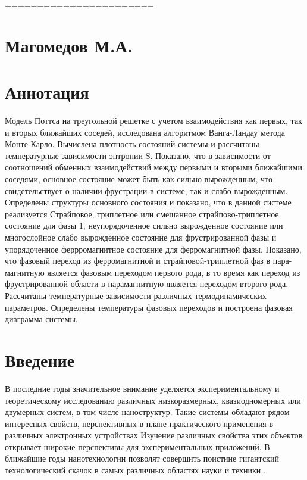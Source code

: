 
=======================


\section{Магомедов М.А.}








\section{Аннотация}

Модель Поттса на треугольной решетке с учетом взаимодействия как первых, так и вторых ближайших соседей, исследована алгоритмом Ванга-Ландау метода Монте-Карло. Вычислена плотность состояний системы и рассчитаны температурные зависимости энтропии S. Показано, что в зависимости от соотношений обменных взаимодействий между первыми и вторыми ближайшими соседями, основное состояние может быть как сильно вырожденным, что свидетельствует о наличии фрустрации в системе, так и слабо вырожденным.
Определены структуры основного состояния и показано, что в данной системе реализуется Страйповое, триплетное или смешанное страйпово-триплетное состояние для фазы 1, неупорядоченное сильно вырожденное состояние или многослойное слабо вырожденное состояние для фрустрированной фазы и упорядоченное феррромагнитное состояние для ферромагнитной фазы.
Показано, что фазовый переход из ферромагнитной и страйповой-триплетной фаз в пара-магнитную является фазовым переходом первого рода, в то время как переход из фрустрированной области в парамагнитную является переходом второго рода. Рассчитаны температурные зависимости различных термодинамических параметров. Определены температуры фазовых переходов и построена фазовая диаграмма системы.




\section{Введение}


В последние годы  значительное внимание уделяется экспериментальному и теоретическому исследованию различных низкоразмерных, квазиодномерных или двумерных систем, в том числе наноструктур. Такие системы обладают рядом интересных свойств, перспективных в плане практического применения в различных электронных устройствах Изучение различных свойства этих объектов открывает широкие перспективы для экспериментальных приложений. В ближайшие годы нанотехнологии позволят совершить поистине гигантский технологический скачок в самых различных областях науки и техники \cite{phys3-bib-1}.

